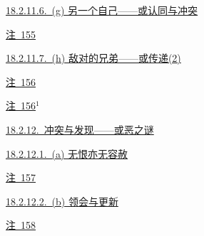 \par\noindent\hspace*{2.70em}\hyperref[ch18:local:h68]{18.2.11.6.~(g) 另一个自己——或认同与冲突}\nobreak\dotfill\nobreak\hyperref[ch18:local:h68]{\pageref*{ch18:local:h68}}\par
\par\noindent\hspace*{4.05em}\hyperref[ch18:local:n63]{注~155}\nobreak\dotfill\nobreak\hyperref[ch18:local:n63]{\pageref*{ch18:local:n63}}\par
\par\noindent\hspace*{2.70em}\hyperref[ch18:local:h69]{18.2.11.7.~(h) 敌对的兄弟——或传递(2)}\nobreak\dotfill\nobreak\hyperref[ch18:local:h69]{\pageref*{ch18:local:h69}}\par
\par\noindent\hspace*{4.05em}\hyperref[ch18:local:n64]{注~156}\nobreak\dotfill\nobreak\hyperref[ch18:local:n64]{\pageref*{ch18:local:n64}}\par
\par\noindent\hspace*{4.05em}\hyperref[ch18:local:n65]{注~156$^1$}\nobreak\dotfill\nobreak\hyperref[ch18:local:n65]{\pageref*{ch18:local:n65}}\par
\par\noindent\hspace*{1.35em}\hyperref[ch18:local:h70]{18.2.12.~冲突与发现——或恶之谜}\nobreak\dotfill\nobreak\hyperref[ch18:local:h70]{\pageref*{ch18:local:h70}}\par
\par\noindent\hspace*{2.70em}\hyperref[ch18:local:h71]{18.2.12.1.~(a) 无恨亦无容赦}\nobreak\dotfill\nobreak\hyperref[ch18:local:h71]{\pageref*{ch18:local:h71}}\par
\par\noindent\hspace*{4.05em}\hyperref[ch18:local:n66]{注~157}\nobreak\dotfill\nobreak\hyperref[ch18:local:n66]{\pageref*{ch18:local:n66}}\par
\par\noindent\hspace*{2.70em}\hyperref[ch18:local:h72]{18.2.12.2.~(b) 领会与更新}\nobreak\dotfill\nobreak\hyperref[ch18:local:h72]{\pageref*{ch18:local:h72}}\par
\par\noindent\hspace*{4.05em}\hyperref[ch18:local:n67]{注~158}\nobreak\dotfill\nobreak\hyperref[ch18:local:n67]{\pageref*{ch18:local:n67}}\par
